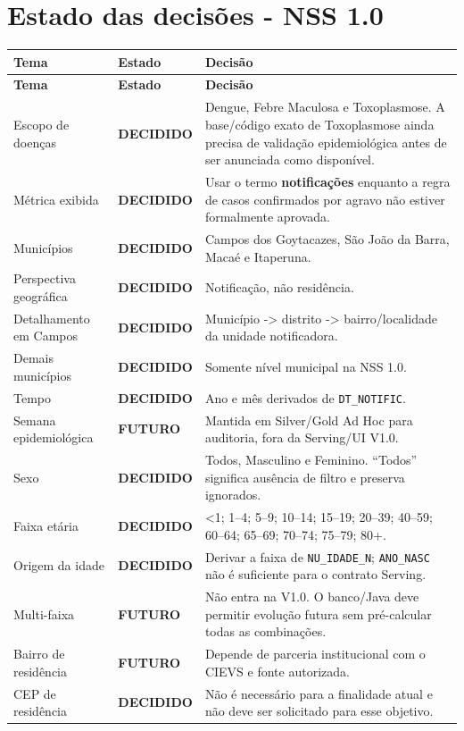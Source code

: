 \documentclass[12pt,a4paper]{article}
\newcommand{\statusDecidido}{\textcolor{decidido}{\textbf{DECIDIDO}}}\newcommand{\statusPendente}{\textcolor{pendente}{\textbf{PENDENTE}}}\newcommand{\statusFuturo}{\textcolor{futuro}{\textbf{FUTURO}}}
\begin{document}
\section{Estado das decisões - NSS 1.0}
\begin{longtable}{p{4.4cm}p{2.4cm}p{8.2cm}}\toprule\textbf{Tema} & \textbf{Estado} & \textbf{Decisão} \\\midrule\endfirsthead\toprule\textbf{Tema} & \textbf{Estado} & \textbf{Decisão} \\\midrule\endhead
Escopo de doenças & \statusDecidido & Dengue, Febre Maculosa e Toxoplasmose. A base/código exato de Toxoplasmose ainda precisa de validação epidemiológica antes de ser anunciada como disponível. \\
Métrica exibida & \statusDecidido & Usar o termo \textbf{notificações} enquanto a regra de casos confirmados por agravo não estiver formalmente aprovada. \\
Municípios & \statusDecidido & Campos dos Goytacazes, São João da Barra, Macaé e Itaperuna. \\
Perspectiva geográfica & \statusDecidido & Notificação, não residência. \\
Detalhamento em Campos & \statusDecidido & Município -> distrito -> bairro/localidade da unidade notificadora. \\
Demais municípios & \statusDecidido & Somente nível municipal na NSS 1.0. \\
Tempo & \statusDecidido & Ano e mês derivados de \texttt{DT\_NOTIFIC}. \\
Semana epidemiológica & \statusFuturo & Mantida em Silver/Gold Ad Hoc para auditoria, fora da Serving/UI V1.0. \\
Sexo & \statusDecidido & Todos, Masculino e Feminino. ``Todos'' significa ausência de filtro e preserva ignorados. \\
Faixa etária & \statusDecidido & <1; 1--4; 5--9; 10--14; 15--19; 20--39; 40--59; 60--64; 65--69; 70--74; 75--79; 80+. \\
Origem da idade & \statusDecidido & Derivar a faixa de \texttt{NU\_IDADE\_N}; \texttt{ANO\_NASC} não é suficiente para o contrato Serving. \\
Multi-faixa & \statusFuturo & Não entra na V1.0. O banco/Java deve permitir evolução futura sem pré-calcular todas as combinações. \\
Bairro de residência & \statusFuturo & Depende de parceria institucional com o CIEVS e fonte autorizada. \\
CEP de residência & \statusDecidido & Não é necessário para a finalidade atual e não deve ser solicitado para esse objetivo. \\

\end{longtable}
\end{document}

